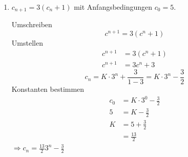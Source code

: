 \documentclass{article} %
\begin{document}
\begin{enumerate}
    \begin{mybox}
    Umschreiben 
    \[
    b^{n+2} = 4(b^{n+1} - b^n)
    \]
    Umstellen 
    \begin{align*}
        b^{n+2} & = 4(b^{n+1} - b^n) \\
        b^{n+2} & = 4b^{n+1} - 4b^n & \mid :b^n \\
        b^{2} & = 4b - 4 \\
        0 & = b^2 -4b +4 
    \end{align*}
    pq-Formel
    \begin{align*}
        b_{1,2} & = -\frac{-4}{2} \pm \sqrt{(\frac{-4}{2})^2 -4 } \\
        & = 2 \pm \sqrt{4-4 } \\
         & = 2 \pm \sqrt{0}  \\
         & = 2
    \end{align*}
    Allgemeine Lösung: 
    \[
    b_n = c_1 \cdot 2^n + c_2 \cdot n \cdot 2^n
    \]
    Konstanten bestimmen
    \[
     b_0 = -5 = c_1 \cdot 2^0 + c_2 \cdot 0 \cdot 2^0 =  c_1  
    \]
    \[
    b_1 = -2 = c_1 \cdot 2^1 + c_2 \cdot 1 \cdot 2^1 = 2c_1 + 2c_2 = 2(-5) + 2c_2 = -10 + 2c_2 
    \]
    \[
    \Rightarrow 2c_2 = 8 \Rightarrow c_2 = 4
    \]
    $\Rightarrow b_n = 2^n(-5+4)$
    \end{mybox}
    \item $c_{n+1} = 3(c_n + 1)$ mit Anfangsbedingungen $c_0 = 5$.
    \begin{mybox}
    Umschreiben 
    \[
    c^{n+1} = 3(c^n + 1)
    \]
    Umstellen 
    \begin{align*} 
        c^{n+1} & = 3(c^n + 1) \\
        c^{n+1} & = 3c^n + 3
    \end{align*}
    \[
    c_n = K \cdot 3^n + \frac{3}{1-3} = K \cdot 3^n - \frac{3}{2}
    \]
    Konstanten bestimmen 
    \begin{align*}
        c_0 & = K \cdot 3^0 - \frac{3}{2} \\
        5 &  = K - \frac{3}{2} \\
        K & = 5 +  \frac{3}{2}  \\
        & = \frac{13}{2}
    \end{align*}
    $\Rightarrow c_n = \frac{13}{2} 3^n - \frac{3}{2}$
    \end{mybox}
\end{enumerate}

\vspace{1em}
\end{document}

